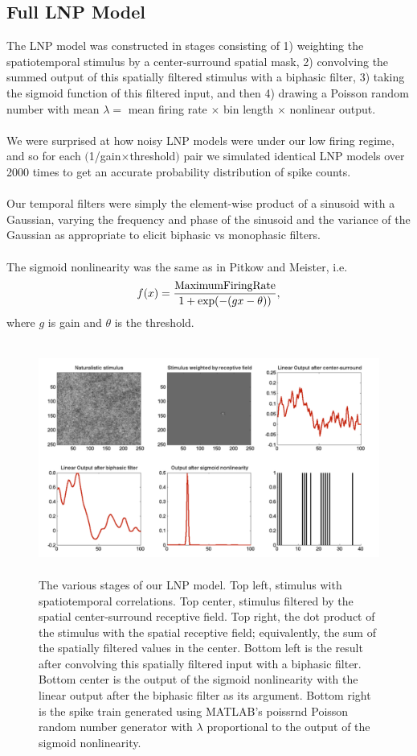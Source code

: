 \documentclass[12pt]{article}
\begin{document}
\subsection{Full LNP Model}
The LNP model was constructed in stages consisting of 1) weighting the spatiotemporal stimulus by a center-surround spatial mask, 2) convolving the summed output of this spatially filtered stimulus with a biphasic filter, 3) taking the sigmoid function of this filtered input, and then 4) drawing a Poisson random number with mean $\lambda = $ mean firing rate $\times$ bin length $\times$ nonlinear output. \\
\\
We were surprised at how noisy LNP models were under our low firing regime, and so for each $($1/gain$\times$threshold$)$ pair we simulated identical LNP models over 2000 times to get an accurate probability distribution of spike counts. \\
\\
Our temporal filters were simply the element-wise product of a sinusoid with a Gaussian, varying the frequency and phase of the sinusoid and the variance of the Gaussian as appropriate to elicit biphasic vs monophasic filters.  \\
\\
The sigmoid nonlinearity was the same as in Pitkow and Meister, i.e.
\begin{align*}
f(x) = \frac{{\rm Maximum Firing Rate}}{1 + \exp(-(gx - \theta))},
\end{align*}
where $g$ is gain and $\theta$ is the threshold.

\begin{figure}[h!!]
\centerline{\includegraphics*[height = 3.0in,width=5.5in]{lnpMovieEnd.pdf}}
\label{Figure whatever}
\caption{The various stages of our LNP model.  Top left, stimulus with spatiotemporal correlations.  Top center, stimulus filtered by the spatial center-surround receptive field.  Top right, the dot product of the stimulus with the spatial receptive field; equivalently, the sum of the spatially filtered values in the center.  Bottom left is the result after convolving this spatially filtered input with a biphasic filter.  Bottom center is the output of the sigmoid nonlinearity with the linear output after the biphasic filter as its argument.  Bottom right is the spike train generated using MATLAB's poissrnd Poisson random number generator with $\lambda$ proportional to the output of the sigmoid nonlinearity.}
\end{figure}
\end{document}
